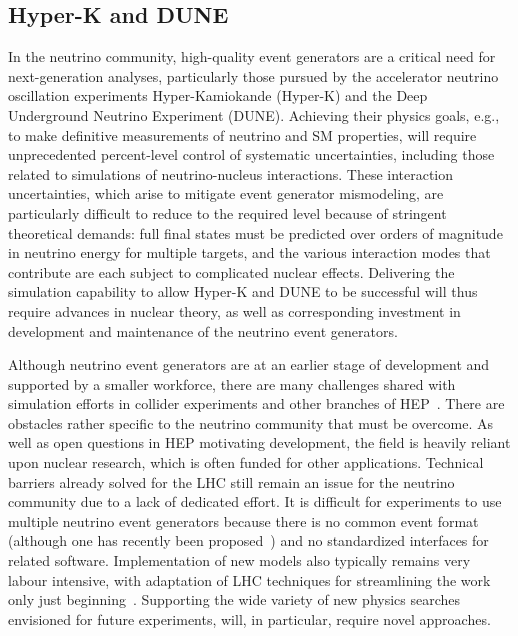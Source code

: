 \documentclass[10pt,a4paper]{article}
\begin{document}
\subsection{Hyper-K and DUNE}\label{hyper-k-and-dune}

In the neutrino community, high-quality event generators are a critical
need for next-generation analyses, particularly those pursued by the
accelerator neutrino oscillation experiments Hyper-Kamiokande (Hyper-K)
and the Deep Underground Neutrino Experiment (DUNE). Achieving their
physics goals, e.g., to make definitive measurements of neutrino and SM
properties, will require unprecedented percent-level control of
systematic uncertainties, including those related to simulations of
neutrino-nucleus interactions. These interaction uncertainties, which
arise to mitigate event generator mismodeling, are particularly
difficult to reduce to the required level because of stringent
theoretical demands: full final states must be predicted over orders of
magnitude in neutrino energy for multiple targets, and the various
interaction modes that contribute are each subject to complicated
nuclear effects. Delivering the simulation capability to allow Hyper-K
and DUNE to be successful will thus require advances in nuclear theory,
as well as corresponding investment in development and maintenance of
the neutrino event generators.

Although neutrino event generators are at an earlier stage of
development and supported by a smaller workforce, there are many
challenges shared with simulation efforts in collider experiments and
other branches of HEP~\cite{2203.11110}.
There are obstacles rather specific to the neutrino community that must
be overcome. As well as open questions in HEP motivating development,
the field is heavily reliant upon nuclear research, which is often
funded for other applications. Technical barriers already solved for the
LHC still remain an issue for the neutrino community due to a lack of
dedicated effort. It is difficult for experiments to use multiple
neutrino event generators because there is no common event format
(although one has recently been proposed~\cite{2310.13211})
and no standardized interfaces for related software. Implementation of
new models also typically remains very labour intensive, with adaptation
of LHC techniques for streamlining the work only just beginning~\cite{https://doi.org/10.1103/PhysRevD.105.096006}.
Supporting the wide variety of new physics searches envisioned for
future experiments, will, in particular, require novel approaches.
\end{document}
